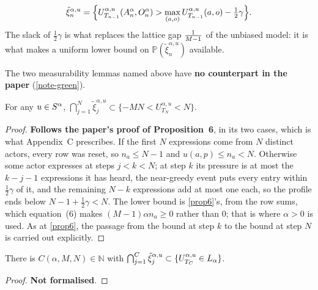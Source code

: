 \begin{definition}
  \label{rem7}
  \leanok
  \[
    \tilde{\xi}_n^{\alpha,u} = \Bigl\{ U^{\alpha,u}_{T_{n-1}}(A_n^\alpha, O_n^\alpha)
      > \max_{(a,o)} U^{\alpha,u}_{T_{n-1}}(a,o) - \tfrac{1}{2}\gamma \Bigr\} .
  \]
  The slack of $\tfrac{1}{2}\gamma$ is what replaces the lattice gap $\tfrac{1}{M-1}$
  of the unbiased model: it is what makes a uniform lower bound on
  $\mathbb{P}(\tilde{\xi}_n^{\alpha,u})$ available.

  The two measurability lemmas named above have \textbf{no counterpart in the
  paper} (\ref{note-green}).
\end{definition}

\begin{proposition}
  \label{prop22}
  \leanok
  For any $u \in S^\alpha$,
  $\bigcap_{j=1}^{N} \tilde{\xi}_j^{\alpha,u} \subset \{ -MN < U^{\alpha,u}_{T_N} < N \}$.
\end{proposition}
\begin{proof}
  \leanok
  \textbf{Follows the paper's proof of Proposition~6}, in its two cases, which
  is what Appendix~C prescribes.  If the first $N$ expressions come from $N$
  distinct actors, every row was reset, so $n_a \le N-1$ and $u(a,p) \le n_a <
  N$.  Otherwise some actor expresses at steps $j < k < N$; at step $k$ its
  pressure is at most the $k-j-1$ expressions it has heard, the near-greedy
  event puts every entry within $\tfrac{1}{2}\gamma$ of it, and the remaining
  $N-k$ expressions add at most one each, so the profile ends below $N - 1 +
  \tfrac{1}{2}\gamma < N$.  The lower bound is \ref{prop6}'s, from the row sums,
  which equation~(6) makes $(M-1)\alpha n_a \ge 0$ rather than $0$; that is
  where $\alpha > 0$ is used.  As at \ref{prop6}, the passage from the bound at
  step $k$ to the bound at step $N$ is carried out explicitly.
\end{proof}

\begin{proposition}
  \label{prop23}
  \leanok
  There is $C(\alpha, M, N) \in \mathbb{N}$ with
  $\bigcap_{j=1}^{C} \tilde{\xi}_j^{\alpha,u}
   \subset \{ U^{\alpha,u}_{T_{C}} \in L_\alpha \}$.
\end{proposition}
\begin{proof}
  \textbf{Not formalised}.
\end{proof}

